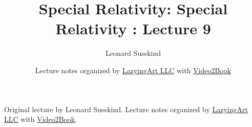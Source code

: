 \documentclass[11pt,oneside]{book}
\begin{document}
\frontmatter
\title{Special Relativity: Special Relativity : Lecture 9}
\author{Leonard Susskind}
\date{Lecture notes organized by \href{https://lazying.art}{LazyingArt LLC} with \href{https://github.com/lachlanchen/Video2Book}{Video2Book}}
\maketitle
\begin{center}
\small Original lecture by Leonard Susskind. Lecture notes organized by \href{https://lazying.art}{LazyingArt LLC} with \href{https://github.com/lachlanchen/Video2Book}{Video2Book}.
\end{center}
\clearpage
\mainmatter

\end{document}
